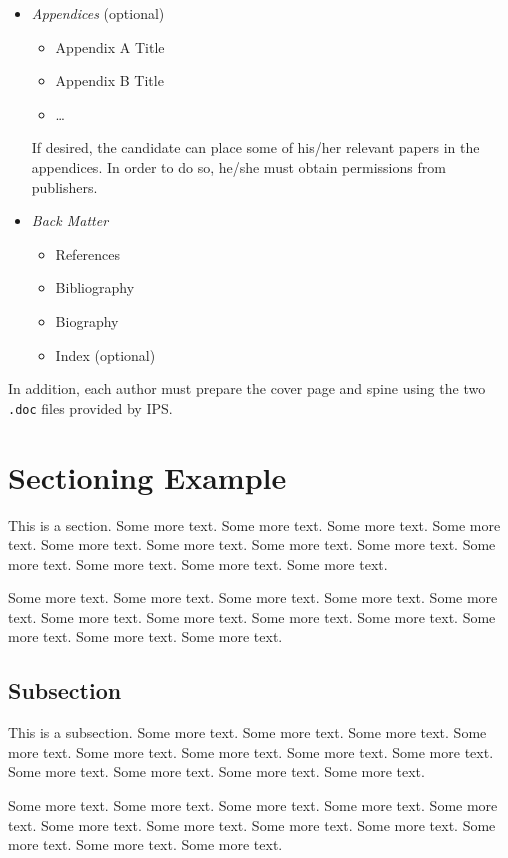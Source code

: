 \begin{itemize}
	\item \emph{Appendices} (optional)
	\begin{itemize}
		\item Appendix A Title
		\item Appendix B Title
		\item \dots
	\end{itemize}
	If desired, the candidate can place some of his/her relevant papers in the appendices. In order to do so, he/she must obtain permissions from publishers.
	\item \emph{Back Matter}
	\begin{itemize}
		\item References
		\item Bibliography 
		\item Biography
		\item Index (optional)
	\end{itemize}
\end{itemize}

In addition, each author must prepare the cover page and spine using the two \texttt{.doc} files provided by IPS.

\section{Sectioning Example}

This is a section. Some more text. Some more text. Some more text. Some more text. Some more text. Some more text. Some more text. Some more text. Some more text. Some more text. Some more text. Some more text. 

Some more text. Some more text. Some more text. Some more text. Some more text. Some more text. Some more text. Some more text. Some more text. Some more text. Some more text. Some more text. 

\subsection{Subsection}

This is a subsection. Some more text. Some more text. Some more text. Some more text. Some more text. Some more text. Some more text. Some more text. Some more text. Some more text. Some more text. Some more text. 

Some more text. Some more text. Some more text. Some more text. Some more text. Some more text. Some more text. Some more text. Some more text. Some more text. Some more text. Some more text. 

